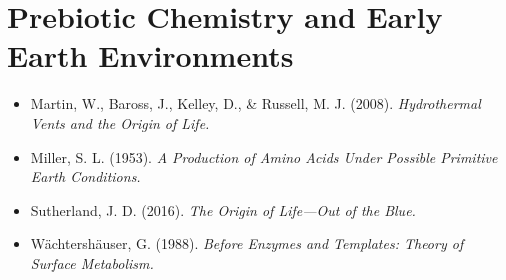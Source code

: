 \documentclass[
  oneside,
  openany]{book}
\providecommand{\tightlist}{%
  \setlength{\itemsep}{0pt}\setlength{\parskip}{0pt}}
\begin{document}
\section{Prebiotic Chemistry and Early Earth Environments}\label{prebiotic-chemistry-and-early-earth-environments}

\begin{itemize}
\tightlist
\item
  Martin, W., Baross, J., Kelley, D., \& Russell, M. J. (2008). \emph{Hydrothermal Vents and the Origin of Life.}
\item
  Miller, S. L. (1953). \emph{A Production of Amino Acids Under Possible Primitive Earth Conditions.}
\item
  Sutherland, J. D. (2016). \emph{The Origin of Life---Out of the Blue.}
\item
  Wächtershäuser, G. (1988). \emph{Before Enzymes and Templates: Theory of Surface Metabolism.}
\end{itemize}
\end{document}
